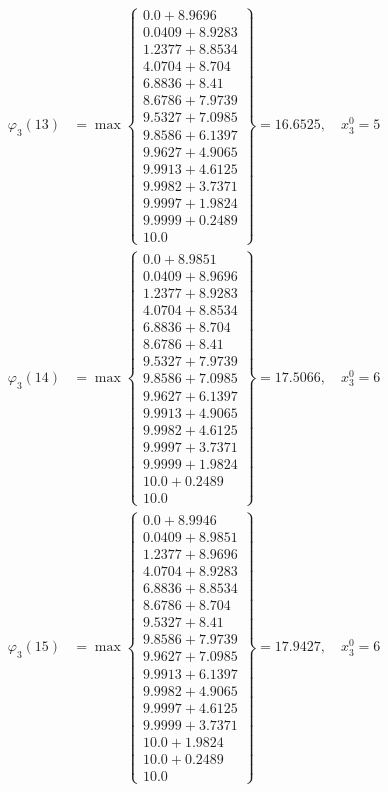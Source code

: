 \documentclass{article}
\begin{document}
\begin{align*}
\varphi_{3}(13) &= \max \left\{ \begin{array}{c}
0.0 + 8.9696 \\
 0.0409 + 8.9283 \\
 1.2377 + 8.8534 \\
 4.0704 + 8.704 \\
 6.8836 + 8.41 \\
 8.6786 + 7.9739 \\
 9.5327 + 7.0985 \\
 9.8586 + 6.1397 \\
 9.9627 + 4.9065 \\
 9.9913 + 4.6125 \\
 9.9982 + 3.7371 \\
 9.9997 + 1.9824 \\
 9.9999 + 0.2489 \\
 10.0
\end{array} \right\}=16.6525, \quad x_{3}^0=5\\
  
\varphi_{3}(14) &= \max \left\{ \begin{array}{c}
0.0 + 8.9851 \\
 0.0409 + 8.9696 \\
 1.2377 + 8.9283 \\
 4.0704 + 8.8534 \\
 6.8836 + 8.704 \\
 8.6786 + 8.41 \\
 9.5327 + 7.9739 \\
 9.8586 + 7.0985 \\
 9.9627 + 6.1397 \\
 9.9913 + 4.9065 \\
 9.9982 + 4.6125 \\
 9.9997 + 3.7371 \\
 9.9999 + 1.9824 \\
 10.0 + 0.2489 \\
 10.0
\end{array} \right\}=17.5066, \quad x_{3}^0=6\\
  
\varphi_{3}(15) &= \max \left\{ \begin{array}{c}
0.0 + 8.9946 \\
 0.0409 + 8.9851 \\
 1.2377 + 8.9696 \\
 4.0704 + 8.9283 \\
 6.8836 + 8.8534 \\
 8.6786 + 8.704 \\
 9.5327 + 8.41 \\
 9.8586 + 7.9739 \\
 9.9627 + 7.0985 \\
 9.9913 + 6.1397 \\
 9.9982 + 4.9065 \\
 9.9997 + 4.6125 \\
 9.9999 + 3.7371 \\
 10.0 + 1.9824 \\
 10.0 + 0.2489 \\
 10.0
\end{array} \right\}=17.9427, \quad x_{3}^0=6\\
  

\end{align*}
\end{document}
